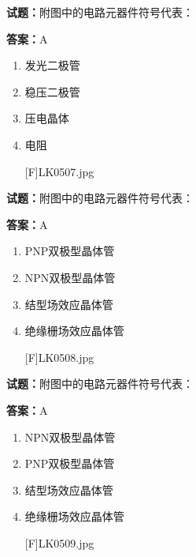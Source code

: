 \documentclass{ctexbook}
\begin{document}




\vspace{1em}

\textbf{试题：}附图中的电路元器件符号代表： 

\textbf{答案：}A 

\begin{enumerate}[leftmargin=3em]
  \item 发光二极管 

  \item 稳压二极管 

  \item 压电晶体 

  \item 电阻 

[F]LK0507.jpg 

\end{enumerate}





\vspace{1em}

\textbf{试题：}附图中的电路元器件符号代表： 

\textbf{答案：}A 

\begin{enumerate}[leftmargin=3em]
  \item PNP双极型晶体管 

  \item NPN双极型晶体管 

  \item 结型场效应晶体管 

  \item 绝缘栅场效应晶体管 

[F]LK0508.jpg 

\end{enumerate}





\vspace{1em}

\textbf{试题：}附图中的电路元器件符号代表： 

\textbf{答案：}A 

\begin{enumerate}[leftmargin=3em]
  \item NPN双极型晶体管 

  \item PNP双极型晶体管 

  \item 结型场效应晶体管 


  \item 绝缘栅场效应晶体管 

[F]LK0509.jpg 

\end{enumerate}
\end{document}

